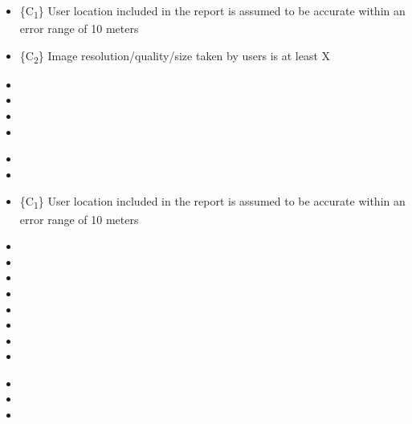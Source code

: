 	
\begin{itemize}

	\item \{C\textsubscript{1}\} User location included in the report is assumed to be accurate within an error range of 10 meters
	\item \{C\textsubscript{2}\} Image resolution/quality/size taken by users is at least X
\end{itemize}


\textbf{}

\begin{itemize}
	\item {}
	\item {}
	\item {}
	\item {}
\end{itemize}

\begin{itemize}

	\item {}
	\item {}
\end{itemize}

\begin{itemize}
	\item \{C\textsubscript{1}\} User location included in the report is assumed to be accurate within an error range of 10 meters
\end{itemize}

\textbf{}

\begin{itemize}

	\item {}
	\item {}
	\item {}
	\item {}
	\item {}
	\item {}
	\item {}
	\item {}
\end{itemize}

\begin{itemize}

	\item {}
	\item {}
	\item {}
\end{itemize}


